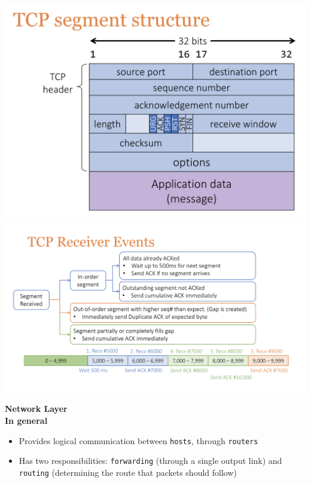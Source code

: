 \documentclass[a4paper]{article} \usepackage[backend=biber, style=numeric, sorting=none]{biblatex}
\begin{document}
\begin{multicols*}{4}
{\centering \includegraphics[scale=0.20]{tcp_segment_structure}}
{\centering \includegraphics[scale=0.18]{tcp_receiver_events}}

{\small\textbf{Network Layer}} \\
\textbf{In general}
\begin{itemize}[leftmargin=*]
\item Provides logical communication between \texttt{hosts}, through \texttt{routers}
\item Has two responsibilities: \texttt{forwarding} (through a single output link) and \texttt{routing} (determining the route that packets should follow)
\end{itemize}


\end{multicols*}
\end{document}
